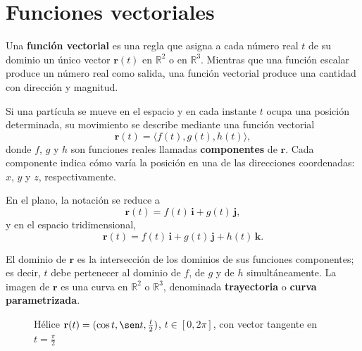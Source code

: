 \section{Funciones vectoriales}
\label{sec:vector-functions}
\begin{definition}
Una \textbf{función vectorial} es una regla que asigna a cada número
real $t$ de su dominio un único vector $\mathbf{r}(t)$ en
$\mathbb{R}^2$ o en $\mathbb{R}^3$. Mientras que una función escalar
produce un número real como salida, una función vectorial produce una
cantidad con dirección y magnitud.

Si una partícula se mueve en el espacio y en cada instante $t$ ocupa una
posición determinada, su movimiento se describe mediante una función
vectorial
\[
\mathbf{r}(t) = \langle f(t), g(t), h(t) \rangle,
\]
donde $f$, $g$ y $h$ son funciones reales llamadas \textbf{componentes}
de $\mathbf{r}$. Cada componente indica cómo varía la posición en una
de las direcciones coordenadas: $x$, $y$ y $z$, respectivamente.

En el plano, la notación se reduce a
\[
\mathbf{r}(t) = f(t)\,\mathbf{i} + g(t)\,\mathbf{j},
\]
y en el espacio tridimensional,
\[
\mathbf{r}(t) = f(t)\,\mathbf{i} + g(t)\,\mathbf{j} + h(t)\,\mathbf{k}.
\]
\end{definition}
El dominio de $\mathbf{r}$ es la intersección de los dominios de sus
funciones componentes; es decir, $t$ debe pertenecer al dominio de
$f$, de $g$ y de $h$ simultáneamente. La imagen de $\mathbf{r}$ es una
curva en $\mathbb{R}^2$ o $\mathbb{R}^3$, denominada \textbf{trayectoria}
o \textbf{curva parametrizada}.

\begin{figure}[!htbp]
\centering
{}
\caption{Hélice $\mathbf{r}(t)=(\cos t,\sen t,\tfrac{t}{2})$,
         $t\in[0,2\pi]$, con vector tangente en $t=\tfrac{\pi}{2}$}
\label{fig:helice_tangente}
\end{figure}


